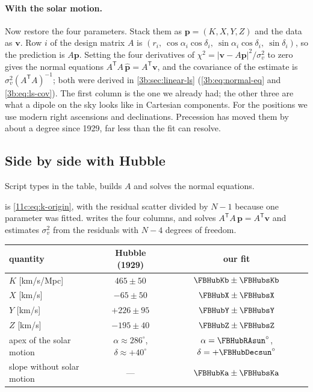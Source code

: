 \paragraph{With the solar motion.} Now restore the four parameters. Stack them as
$\bm p=(K,X,Y,Z)$ and the data as $\bm v$. Row $i$ of the design matrix $A$ is
$(r_i,\ \cos\alpha_i\cos\delta_i,\ \sin\alpha_i\cos\delta_i,\ \sin\delta_i)$, so the
prediction is $A\bm p$. Setting the four derivatives of
$\chi^2=|\bm v-A\bm p|^2/\sigma_v^2$ to zero gives the normal equations
$A^{\mathsf T}A\,\hat{\bm p}=A^{\mathsf T}\bm v$, and the covariance of the estimate is
$\sigma_v^2(A^{\mathsf T}A)^{-1}$; both were derived in \cref{3b:sec:linear-ls}
(\eqref{3b:eq:normal-eq} and \eqref{3b:eq:ls-cov}). The first column is the one
we already had; the other three are what a dipole on the sky looks like in
Cartesian components. For the positions we use modern right ascensions and
declinations. Precession has moved them by about a degree since 1929, far less
than the fit can resolve.

\subsection{Side by side with Hubble}
\label{11c:sec:hubble-compare}

Script  types in the table, builds $A$ and
solves the normal equations.


\noindent {} is \eqref{11c:eq:k-origin}, with the residual
scatter divided by $N-1$ because one parameter was fitted. 
writes the four columns, and  solves $A^{\mathsf T}A\,\bm p=A^{\mathsf
T}\bm v$ and estimates $\sigma_v^2$ from the residuals with $N-4$ degrees of
freedom.

\begin{center}
\small
\begin{tabular}{@{}lcc@{}}
\toprule
quantity & Hubble (1929) & our fit\\
\midrule
$K$ [km/s/Mpc] & $465\pm50$ & $\FBHubKb\pm\FBHubsKb$\\
$X$ [km/s] & $-65\pm50$ & $\FBHubX\pm\FBHubsX$\\
$Y$ [km/s] & $+226\pm95$ & $\FBHubY\pm\FBHubsY$\\
$Z$ [km/s] & $-195\pm40$ & $\FBHubZ\pm\FBHubsZ$\\
apex of the solar motion & $\alpha\approx286^\circ$, $\delta\approx+40^\circ$ &
  $\alpha=\FBHubRAsun^\circ$, $\delta=+\FBHubDecsun^\circ$\\
slope without solar motion & --- & $\FBHubKa\pm\FBHubsKa$\\
\bottomrule
\end{tabular}
\end{center}

